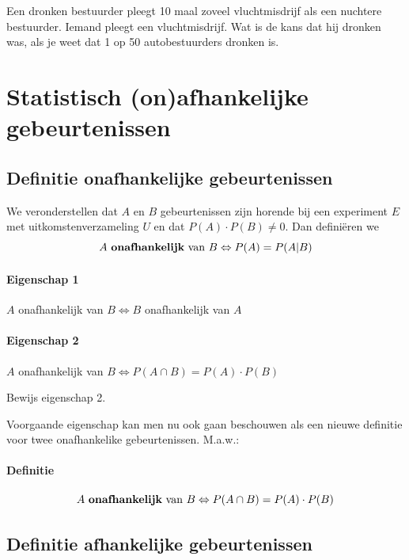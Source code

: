 \documentclass[12pt,twoside]{article}
\begin{document}
\begin{oefening}
Een dronken bestuurder pleegt 10 maal zoveel vluchtmisdrijf als een nuchtere bestuurder. Iemand pleegt een vluchtmisdrijf. Wat is de kans dat hij dronken was, als je weet dat 1 op 50 autobestuurders dronken is.
\end{oefening}

\pagebreak
\section{Statistisch (on)afhankelijke gebeurtenissen}

\subsection{Definitie onafhankelijke gebeurtenissen}

We veronderstellen dat $A$ en $B$ gebeurtenissen zijn horende bij een experiment $E$ met uitkomstenverzameling $U$ en dat $P(A)\cdot P(B) \neq 0$. Dan definiëren we
$$A \mbox{ {\bf onafhankelijk} van } B \Leftrightarrow P(A)=P(A|B)$$

\paragraph*{Eigenschap 1} $A$ onafhankelijk van $B \Leftrightarrow B$ onafhankelijk van $A$

\paragraph*{Eigenschap 2} $A$ onafhankelijk van $B \Leftrightarrow P(A\cap B)=P(A)\cdot P(B)$

\begin{oefening}
Bewijs eigenschap 2.
\end{oefening}

Voorgaande eigenschap kan men nu ook gaan beschouwen als een nieuwe definitie voor twee onafhankelike gebeurtenissen. M.a.w.:

\paragraph*{Definitie}
\begin{mdframed}
$$A \mbox{ {\bf onafhankelijk} van } B \Leftrightarrow P(A\cap B)=P(A)\cdot P(B)$$
\end{mdframed}

\subsection{Definitie afhankelijke gebeurtenissen}
\end{document}
